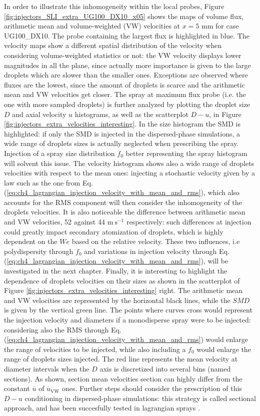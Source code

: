 In order to illustrate this inhomogeneity within the local probes, Figure \ref{fig:injectors_SLI_extra_UG100_DX10_x05} shows the maps of volume flux, arithmetic mean and volume-weighted (VW) velocities at $x = 5$ mm for case UG100\_DX10. The probe containing the largest flux is highlighted in blue. The velocity maps show a different spatial distribution of the velocity when considering volume-weighted statistics or not: the VW velocity displays lower magnitudes in all the plane, since actually more importance is given to the large droplets which are slower than the smaller ones. Exceptions are observed where fluxes are the lowest, since the amount of droplets is scarce and the arithmetic mean and VW velocities get closer. The spray at maximum flux probe (i.e. the one with more sampled droplets) is further analyzed by plotting the droplet size $D$ and axial velocity $u$ histograms, as well as the scatterplot $D - u$, in Figure \ref{fig:injectors_extra_velocities_interesting}. In the size histogram the SMD is highlighted: if only the SMD is injected in the dispersed-phase simulations, a wide range of droplets sizes is actually neglected when prescribing the spray. Injection of a spray size distribution $f_0$ better representing the spray histogram will solvent this issue. The velocity histogram shows also a wide range of droplets velocities with respect to the mean ones: injecting a stochastic velocity given by a law such as the one from Eq. (\ref{eq:ch4_lagrangian_injection_velocity_with_mean_and_rms}), which also accounts for the RMS component will then consider the inhomogeneity of the droplets velocities. It is also noticeable the difference between arithmetic mean and VW velocities, 52 against 44 $\mathrm{m~s}^{-1}$ respectively: such differences at injection could greatly impact secondary atomization of droplets, which is highly dependent on the $We$ based on the relative velocity. These two influences, i.e polydispersity through $f_0$ and variations in injection velocity through Eq. (\ref{eq:ch4_lagrangian_injection_velocity_with_mean_and_rms}), will be investigated in the next chapter. Finally, it is interesting to highlight the dependence of droplets velocities on their sizes as shown in the scatterplot of Figure \ref{fig:injectors_extra_velocities_interesting} right. The arithmetic mean and VW velocities are represented by the horizontal black lines, while the $SMD$ is given by the vertical green line. The points where curves cross would represent the injection velocity and diameters if a monodisperse spray were to be injected: considering also the RMS through Eq. (\ref{eq:ch4_lagrangian_injection_velocity_with_mean_and_rms}) would enlarge the range of velocities to be injected, while also including a $f_0$ would enlarge the range of droplets sizes injected. The red line represents the mean velocity at diameter intervals when the $D$ axis is discretized into several bins (named sections). As shown, section mean velocities section can highly differ from the constant $\overline{u}$ of $\overline{u}_\mathrm{VW}$ ones. Further steps should consider the prescription of this $D - u$ conditioning in dispersed-phase simulations: this strategy is called sectional approach, and has been succesfully tested in lagrangian sprays . 

